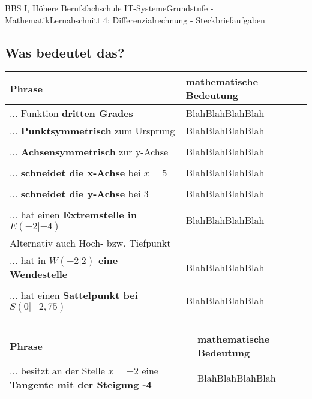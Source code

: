 \documentclass[11pt,oneside,openany,headings=optiontotoc,11pt,numbers=noenddot]{article}
\begin{document}
	\begin{worksheet}{BBS I, Höhere Berufsfachschule IT-Systeme}{Grundstufe - Mathematik}{Lernabschnitt 4: Differenzialrechnung - Steckbriefaufgaben}
		\noindent
		\setcounter{section}{7}
		\setcounter{subsection}{5}
		\subsection{Was bedeutet das?}
		\renewcommand{\arraystretch}{1.5}
		\begin{tabularx}{\textwidth}{|L{5cm}|X|}
			\hline
			 \textbf{Phrase} & \textbf{mathematische Bedeutung}\\
			\hline
			\hline
			... Funktion \textbf{dritten Grades} & \color{white}BlahBlahBlahBlah\\
			\hline
			... \textbf{Punktsymmetrisch} zum Ursprung & \color{white}BlahBlahBlahBlah\\
			& \\
			\hline
			... \textbf{Achsensymmetrisch} zur y-Achse & \color{white}BlahBlahBlahBlah\\
			& \\
			\hline
			... \textbf{schneidet die x-Achse} bei \(x = 5\) & \color{white}BlahBlahBlahBlah\\
			& \\
			\hline
			... \textbf{schneidet die y-Achse} bei \(3\) & \color{white}BlahBlahBlahBlah\\
			& \\
			\hline
			... hat einen \textbf{Extremstelle in \(E(-2|-4)\)} & \color{white}BlahBlahBlahBlah\\
			\footnotesize{Alternativ auch Hoch- bzw. Tiefpunkt} & \normalsize\\
			\hline
			... hat in \textbf{\(W(-2|2)\) eine Wendestelle} & \color{white}BlahBlahBlahBlah\\
			& \\
			\hline
			... hat einen \textbf{Sattelpunkt bei \(S(0|-2,75)\)} & \color{white}BlahBlahBlahBlah\\
			& \\
			\hline
		\end{tabularx}
		\begin{tabularx}{\textwidth}{|L{5cm}|X|}
			\hline
			 \textbf{Phrase} & \textbf{mathematische Bedeutung}\\
			\hline
			\hline
			... besitzt an der Stelle \(x = -2\) eine \textbf{Tangente mit der Steigung -4} & \color{white}BlahBlahBlahBlah\\

\end{tabularx}
\end{worksheet}
\end{document}
